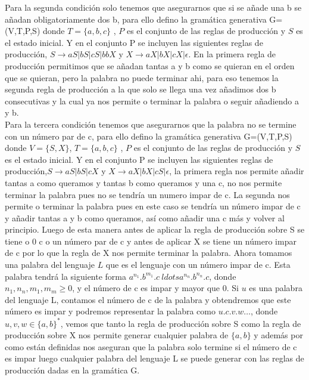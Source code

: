 \documentclass[a4paper,11pt]{article}
\begin{document}
Para la segunda condición solo tenemos que asegurarnos que si se añade una b se añadan obligatoriamente dos b, para ello defino la gramática generativa G=(V,T,P,S) donde $T=\{a,b,c\}$ , $P$ es el conjunto de las reglas de producción y $S$ es el estado inicial. Y en el conjunto P se incluyen las siguientes reglas de producción, $S \rightarrow aS|bS|cS|bbX$ y $X \rightarrow aX|bX|cX|\epsilon$. En la primera regla de producción permitimos que se añadan tantas a y b como se quieran en el orden que se quieran, pero la palabra no puede terminar ahi, para eso tenemos la segunda regla de producción a la que solo se llega una vez añadimos dos b consecutivas y la cual ya nos permite o terminar la palabra o seguir añadiendo a y b. \\

Para la tercera condición tenemos que asegurarnos que la palabra no se termine con un número par de c, para ello defino la gramática generativa G=(V,T,P,S) donde $V=\{S,X\}$, $T=\{a,b,c\}$ , $P$ es el conjunto de las reglas de producción y $S$ es el estado inicial. Y en el conjunto P se incluyen las siguientes reglas de producción,$S \rightarrow aS|bS|cX$ y $X \rightarrow aX|bX|cS|\epsilon$, la primera regla nos permite añadir tantas a como queramos y tantas b como queramos y una c, no nos permite terminar la palabra pues no se tendría un numero impar de c. La segunda nos permite o terminar la palabra pues en este caso se tendría un número impar de c y añadir tantas a y b como queramos, así como añadir una c más y volver al principio. Luego de esta manera antes de aplicar la regla de producción sobre S se tiene o 0 c o un número par de c y antes de aplicar X se tiene un número impar de c por lo que la regla de X nos permite terminar la palabra. Ahora tomamos una palabra del lenguaje $L$ que es el lenguaje con un número impar de c. Esta palabra tendrá la siguiente forma $a^{n_1}.b^{m_1}.c\ ldots a^{n_n}.b^{n_n}.c$, donde $n_1,n_n,m_1,m_m \geq 0$, y el número de c es impar y mayor que 0. Si $u$ es una palabra del lenguaje L,  contamos el número de c de la palabra y obtendremos que este número es impar y podremos representar la palabra como $u.c.v.w \ldots$, donde $u,v,w \in \{a,b\}^*$, vemos que tanto la regla de producción sobre S como la regla de producción sobre X nos permite generar cualquier palabra de $\{a,b\}$ y además por como están definidas nos aseguran que la palabra solo termine si el número de c es impar luego cualquier palabra del lenguaje L se puede generar con las reglas de producción dadas en la gramática G. \\
\end{document}
